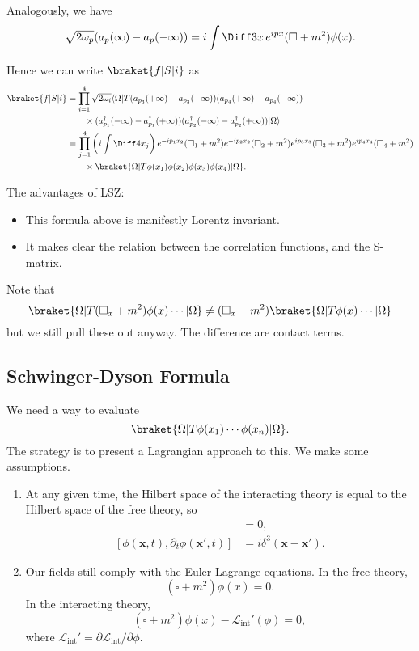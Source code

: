 \documentclass[12pt]{article}
\begin{document}
Analogously, we have
\[
	\sqrt{2 \omega_p} (a_p(\infty) - a_p(-\infty)) = i \int \Diff 3 x \, e^{ipx} (\square + m^2)\phi(x).
\]

Hence we can write $\braket{f|S|i}$ as
\begin{align*}
	\braket{f|S|i} &= \prod_{i= 1}^4 \sqrt{2 \omega_i} \langle\Omega | T(a_{p_3}(+\infty) - a_{p_3}(-\infty))(a_{p_4}(+\infty)- a_{p_4}(-\infty))\\
		       & \qquad \times (a_{p_1}^{\dagger}(-\infty)- a_{p_1}^{\dagger}(+\infty))(a_{p_2}^{\dagger}(-\infty) - a_{p_2}^{\dagger}(+\infty))| \Omega\rangle \\
		       &= \prod_{j = 1}^{4} \left( i \int \Diff 4 x_j \right) e^{-ip_1 x_2}(\square_1 + m^2) e^{-ip_2x_2} (\square_2 + m^2) e^{ip_3x_3} (\square_3 + m^2) e^{ip_4x_4}(\square_4+m^2) \\
		       & \qquad \times \braket{\Omega | T \phi(x_1) \phi(x_2) \phi(x_3) \phi(x_4)| \Omega}.
\end{align*}

The advantages of LSZ:
\begin{itemize}
	\item This formula above is manifestly Lorentz invariant.
	\item It makes clear the relation between the correlation functions, and the S-matrix.
\end{itemize}

Note that
\[
	\braket{\Omega | T (\square_x + m^2) \phi(x) \cdots | \Omega} \neq (\square_x + m^2) \braket{\Omega | T \phi(x) \cdots | \Omega}
\]
but we still pull these out anyway. The difference are contact terms.


\subsection{Schwinger-Dyson Formula}%
\label{sub:sdf}

We need a way to evaluate
\[
	\braket{\Omega | T \phi(x_1) \cdots \phi(x_n) | \Omega}.
\]
The strategy is to present a Lagrangian approach to this. We make some assumptions.
\begin{enumerate}
	\item At any given time, the Hilbert space of the interacting theory is equal to the Hilbert space of the free theory, so
		\begin{align*}
			[\phi(\mathbf{x}, t), \phi(\mathbf{x}', t)] &= 0, \\
			[\phi(\mathbf{x}, t), \partial_t \phi(\mathbf{x}', t)] &= i \delta^3(\mathbf{x} - \mathbf{x}').
		\end{align*}
	\item Our fields still comply with the Euler-Lagrange equations. In the free theory,
		\[
			(\square + m^2) \phi(x) = 0.
		\]
		In the interacting theory,
		\[
			(\square + m^2) \phi(x) - \mathcal{L}_{\mathrm{int}}'(\phi) = 0,
		\]
		where $\mathcal{L}_{\mathrm{int}}' = \partial \mathcal{L}_{\mathrm{int}} / \partial \phi$.
\end{enumerate}
\end{document}
